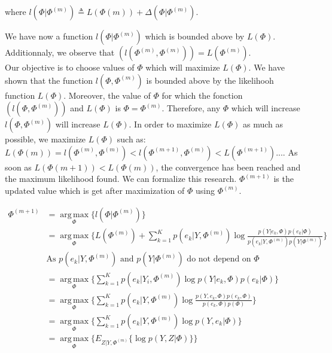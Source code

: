 where $l(\Phi|\Phi^{(m)}) \triangleq  L(\Phi{(m)}) + \Delta(\Phi|\Phi^{(m)})$.\\
\par
We have now a function $l(\Phi|\Phi^{(m)})$ which is bounded above by $L(\Phi)$. Additionnaly, we observe that $(l(\Phi^{(m)},\Phi^{(m)}))=L(\Phi^{(m)})$. \\
Our objective is to choose values of $\Phi$ which will maximize $L(\Phi)$. We have shown that the function $l(\Phi,\Phi^{(m)})$ is bounded above by the likelihooh function $L(\Phi)$. Moreover, the value of $\Phi$ for which the fonction $(l(\Phi,\Phi^{(m)}))$ and $L(\Phi)$ is $\Phi=\Phi^{(m)}$. Therefore, any $\Phi$ which will increase $l(\Phi,\Phi^{(m)})$ will increase $L(\Phi)$. In order to maximize $L(\Phi)$ as much as possible, we maximize $L(\Phi)$ such as: $L(\Phi{(m)})=l(\Phi^{(m)},\Phi^{(m)})<l(\Phi^{(m+1)},\Phi^{(m)})<L(\Phi^{(m+1)})...$. As soon as $L(\Phi{(m+1)})<L(\Phi{(m)})$, the convergence has been reached and the maximum likelihood found. 
We can formalize this research. $\Phi^{(m+1)}$ is the updated value which is get after maximization of $\Phi$ using $\Phi^{(m)}$. %

  \begin{align}\label{eMF}
  \Phi^{(m+1)} &= \operatorname*{arg\,max}_\Phi \{l(\Phi|\Phi^{(m)})\} \nonumber \\         
             &= \operatorname*{arg\,max}_\Phi \{L(\Phi^{(m)}) + \sum_{k=1}^K   p(e_{k}|Y,\Phi^{(m)})\operatorname*{log} \frac{p(Y|e_{k},\Phi)p(e_{k}|\Phi)}{p(e_{k}|Y,\Phi^{(m)})p(Y|\Phi^{(m)})}\} \nonumber \\
             &\mbox{As $p(e_{k}|Y,\Phi^{(m)})$ and $p(Y|\Phi^{(m)})$ do not depend on $\Phi$} \nonumber \\
             &=\operatorname*{arg\,max}_\Phi \{\sum_{k=1}^K   p(e_{k}|Y_i,\Phi^{(m)})\operatorname*{log} p(Y|e_{k},\Phi)p(e_{k}|\Phi) \} \nonumber \\
             &=\operatorname*{arg\,max}_\Phi \{\sum_{k=1}^K   p(e_{k}|Y,\Phi^{(m)})\operatorname*{log} \frac{p(Y,e_{k},\Phi)p(e_{k},\Phi)}{p(e_{k},\Phi)p(\Phi)}\}      \nonumber \\
             &=\operatorname*{arg\,max}_\Phi \{\sum_{k=1}^K   p(e_{k}|Y,\Phi^{(m)})\operatorname*{log} p(Y,e_{k}|\Phi)\} \\
             &=\operatorname*{arg\,max}_\Phi \{ E_{Z|Y,\Phi^{(m)}} \{\operatorname*{log} p(Y,Z|\Phi)\}\} \nonumber
  \end{align}
  
